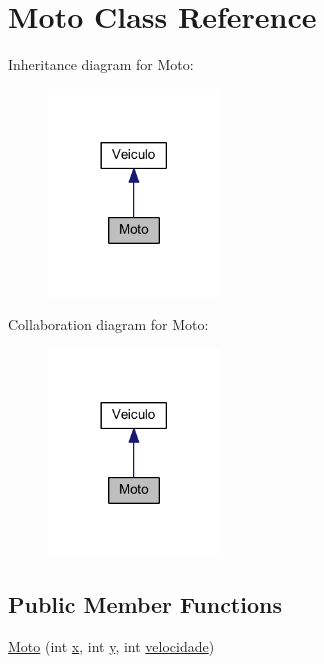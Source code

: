 \hypertarget{class_moto}{}\section{Moto Class Reference}
\label{class_moto}


Inheritance diagram for Moto\+:
\nopagebreak
\begin{figure}[H]
\begin{center}
\leavevmode
\includegraphics[width=129pt]{class_moto__inherit__graph}
\end{center}
\end{figure}


Collaboration diagram for Moto\+:
\nopagebreak
\begin{figure}[H]
\begin{center}
\leavevmode
\includegraphics[width=129pt]{class_moto__coll__graph}
\end{center}
\end{figure}
\subsection*{Public Member Functions}
\begin{DoxyCompactItemize}
\item 
\mbox{\hyperlink{class_moto_ab81ca0fb4282aa5bd34f9b9d6902bdbb}{Moto}} (int \mbox{\hyperlink{class_veiculo_a069917a284297fe5b385258b2afd9ad6}{x}}, int \mbox{\hyperlink{class_veiculo_af25046404db7c2786c0d9e468bb1fb64}{y}}, int \mbox{\hyperlink{class_veiculo_a2edf5e3132b1c2504c441dc095dc7e0e}{velocidade}})
\end{DoxyCompactItemize}
